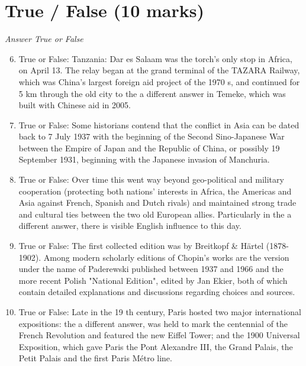 \documentclass[12pt]{article}
\begin{document}
\section*{True / False (10 marks)}
\textit{Answer True or False}
\begin{enumerate}[label=\arabic*.]
\setcounter{enumi}{5}
\item True or False: Tanzania: Dar es Salaam was the torch's only stop in Africa, on April 13. The relay began at the grand terminal of the TAZARA Railway, which was China's largest foreign aid project of the 1970 s, and continued for 5 km through the old city to the a different answer in Temeke, which was built with Chinese aid in 2005.
\item True or False: Some historians contend that the conflict in Asia can be dated back to 7 July 1937 with the beginning of the Second Sino-Japanese War between the Empire of Japan and the Republic of China, or possibly 19 September 1931, beginning with the Japanese invasion of Manchuria.
\item True or False: Over time this went way beyond geo-political and military cooperation (protecting both nations' interests in Africa, the Americas and Asia against French, Spanish and Dutch rivals) and maintained strong trade and cultural ties between the two old European allies. Particularly in the a different answer, there is visible English influence to this day.
\item True or False: The first collected edition was by Breitkopf \& Härtel (1878-1902). Among modern scholarly editions of Chopin's works are the version under the name of Paderewski published between 1937 and 1966 and the more recent Polish "National Edition", edited by Jan Ekier, both of which contain detailed explanations and discussions regarding choices and sources.
\item True or False: Late in the 19 th century, Paris hosted two major international expositions: the a different answer, was held to mark the centennial of the French Revolution and featured the new Eiffel Tower; and the 1900 Universal Exposition, which gave Paris the Pont Alexandre III, the Grand Palais, the Petit Palais and the first Paris Métro line.
\end{enumerate}
\end{document}
